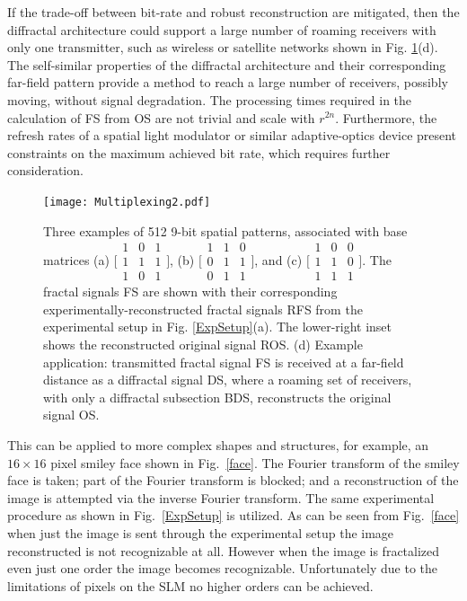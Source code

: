 If the trade-off between bit-rate and robust reconstruction are mitigated, then the diffractal architecture could support a large number of roaming receivers with only one transmitter, such as wireless or satellite networks shown in Fig. \ref{Multiplex}(d). The self-similar properties of the diffractal architecture and their corresponding far-field pattern provide a method to reach a large number of receivers, possibly moving, without signal degradation.  The processing times required in the calculation of FS from OS are not trivial and scale with $r^{2n}$. Furthermore, the refresh rates of a spatial light modulator or similar adaptive-optics device present constraints on the maximum achieved bit rate, which requires further consideration.  

\begin{figure}[t!]
\texttt{[image: Multiplexing2.pdf]}
\caption[]{Three examples of 512 9-bit spatial patterns, associated with base matrices 
(a) $\Big[\begin{smallmatrix} 1 & 0 & 1\\ 1 & 1 & 1\\ 1 & 0 & 1 \end{smallmatrix}\Big]$, (b) $\Big[\begin{smallmatrix} 1 & 1 & 0 \\ 0 & 1 & 1\\ 0 & 1 & 1\end{smallmatrix}\Big]$, and (c) $\Big[\begin{smallmatrix} 1 & 0 & 0 \\ 1 & 1 & 0\\ 1 & 1 & 1\end{smallmatrix}\Big]$. The fractal signals FS are shown with their corresponding experimentally-reconstructed fractal signals RFS from the experimental setup in Fig. \ref{ExpSetup}(a).  The lower-right inset shows the reconstructed original signal ROS. (d) Example application: transmitted fractal signal FS is received at a far-field distance as a diffractal signal DS, where a roaming set of receivers, with only a diffractal subsection BDS, reconstructs the original signal OS.}
\label{Multiplex}
\end{figure}
This can be applied to more complex shapes and structures, for example, an $16\times 16$ pixel smiley face shown in Fig.~\ref{face}. The Fourier transform of the smiley face is taken; part of the Fourier transform is blocked; and a reconstruction of the image is attempted via the inverse Fourier transform. The same experimental procedure as shown in Fig.~\ref{ExpSetup} is utilized. As can be seen from Fig.~\ref{face} when just the image is sent through the experimental setup the image reconstructed is not recognizable at all. However when the image is fractalized even just one order the image becomes recognizable. Unfortunately due to the limitations of pixels on the SLM no higher orders can be achieved.\\
